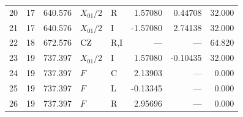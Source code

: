 {\begin{longtable}{@{}rrrllrrr@{}}
20 & 17 & 640.576 & $X_{01}/2$ & R & 1.57080 & 0.44708 & 32.000\\
21 & 17 & 640.576 & $X_{01}/2$ & I & -1.57080 & 2.74138 & 32.000\\
22 & 18 & 672.576 & $\mathrm{CZ}$ & R,I & --- & --- & 64.820\\
23 & 19 & 737.397 & $X_{01}/2$ & I & 1.57080 & -0.10435 & 32.000\\
24 & 19 & 737.397 & $F$ & C & 2.13903 & --- & 0.000\\
25 & 19 & 737.397 & $F$ & L & -0.13345 & --- & 0.000\\
26 & 19 & 737.397 & $F$ & R & 2.95696 & --- & 0.000\\
\end{longtable}}
